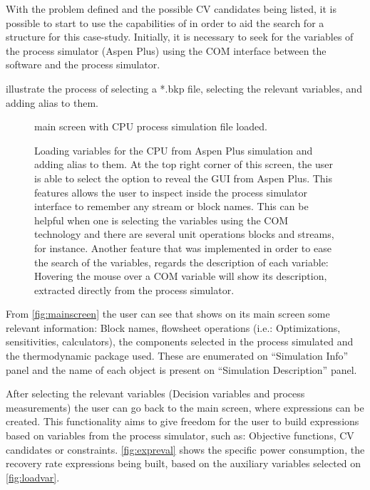 \documentclass[../../msc-thesis.tex]{subfiles}
\begin{document}
With the problem defined and the possible CV candidates being listed, 
it is possible to start to use the capabilities of \mtc in order to aid 
the search for a \soc structure for this case-study. Initially, it is 
necessary to seek for the variables of the process simulator (Aspen Plus) 
using the COM interface between the \mtc software and the process simulator. 

 illustrate the process of selecting a 
*.bkp file, selecting the relevant variables, and adding alias to them.

\begin{figure}[htb]
    \caption{\mtc main screen with CPU process simulation file loaded.}
    \centering
    \label{fig:mainscreen}
    \autfont
\end{figure}

\begin{figure}[htb]
    \centering
    \caption{Loading variables for the CPU from Aspen Plus simulation and 
    adding alias to them. At the top right corner of this screen, the user is 
    able to select the option to reveal the GUI from Aspen Plus. This features 
    allows the user to inspect inside the process simulator interface to 
    remember any stream or block names. This can be helpful when one is 
    selecting the variables using the COM technology and there are several 
    unit operations blocks and streams, for instance. Another feature that 
    was implemented in order to ease the search of the variables, regards 
    the description of each variable: Hovering the mouse over a COM variable 
    will show its description, extracted directly from the process simulator.}
    \label{fig:loadvar}
    \autfont
\end{figure}

From \autoref{fig:mainscreen} the user can see that \mtc shows on its 
main screen some relevant information: Block names, flowsheet operations 
(i.e.: Optimizations, sensitivities, calculators), the components selected 
in the process simulated and the thermodynamic package used. These are 
enumerated on ``Simulation Info'' panel and the name of each object is 
present on ``Simulation Description'' panel.

After selecting the relevant variables (Decision variables and process 
measurements) the user can go back to the main screen, where expressions 
can be created. This functionality aims to give freedom for the user to 
build expressions based on variables from the process simulator, such as: 
Objective functions, CV candidates or constraints. \autoref{fig:expreval} 
shows the specific power consumption, the \co recovery rate expressions 
being built, based on the auxiliary variables selected on 
\autoref{fig:loadvar}.
\end{document}
